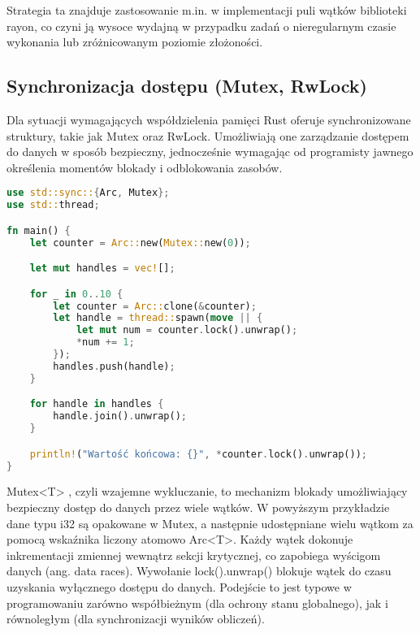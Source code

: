 Strategia ta znajduje zastosowanie m.in. w implementacji puli wątków biblioteki rayon, co czyni ją wysoce wydajną w przypadku zadań o nieregularnym czasie wykonania lub zróżnicowanym poziomie złożoności.

\subsection{Synchronizacja dostępu (Mutex, RwLock)}
Dla sytuacji wymagających współdzielenia pamięci Rust oferuje synchronizowane struktury, takie jak Mutex  oraz RwLock. Umożliwiają one zarządzanie dostępem do danych w sposób bezpieczny, jednocześnie wymagając od programisty jawnego określenia momentów blokady i odblokowania zasobów.

\begin{lstlisting}[language=Rust, caption=Przykład użycia Mutex, label=mutex_example]
use std::sync::{Arc, Mutex};
use std::thread;

fn main() {
    let counter = Arc::new(Mutex::new(0));

    let mut handles = vec![];

    for _ in 0..10 {
        let counter = Arc::clone(&counter);
        let handle = thread::spawn(move || {
            let mut num = counter.lock().unwrap();
            *num += 1;
        });
        handles.push(handle);
    }

    for handle in handles {
        handle.join().unwrap();
    }

    println!("Wartość końcowa: {}", *counter.lock().unwrap());
}
\end{lstlisting}
Mutex<T> , czyli wzajemne wykluczanie, to mechanizm blokady umożliwiający bezpieczny dostęp do danych przez wiele wątków. W powyższym przykładzie dane typu i32 są opakowane w Mutex, a następnie udostępniane wielu wątkom za pomocą wskaźnika liczony atomowo Arc<T>. Każdy wątek dokonuje inkrementacji zmiennej wewnątrz sekcji krytycznej, co zapobiega wyścigom danych (ang. data races). Wywołanie lock().unwrap() blokuje wątek do czasu uzyskania wyłącznego dostępu do danych. Podejście to jest typowe w programowaniu zarówno współbieżnym (dla ochrony stanu globalnego), jak i równoległym (dla synchronizacji wyników obliczeń). 

